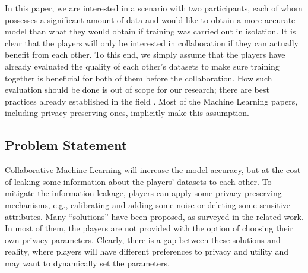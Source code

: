 \documentclass[USenglish,oneside,twocolumn]{article}
\theoremstyle{plain}
\newtheorem*{example}{Example}
\begin{document}
    In this paper, we are interested in a scenario with two participants, each of whom possesses a significant amount of data and would like to obtain a more accurate model than what they would obtain if training was carried out in isolation. It is clear that the players will only be interested in collaboration if they can actually benefit from each other. To this end, we simply assume that the players have already evaluated the quality of each other's datasets to make sure training together is beneficial for both of them before the collaboration. How such evaluation should be done is out of scope for our research; there are best practices already established in the field \cite{dmbook}. Most of the Machine Learning papers, including privacy-preserving ones, implicitly make this assumption. %
    
    
    \vspace{-0.5cm}
    \subsection{Problem Statement}
    \vspace{-0.25cm}
    
    
    Collaborative Machine Learning will increase the model accuracy, but at the cost of leaking some information about the players' datasets to each other. To mitigate the information leakage, players can apply some privacy-preserving mechanisms, e.g., calibrating and adding some noise or deleting some sensitive attributes. Many ``solutions'' have been proposed, as surveyed in the related work. In most of them, the players are not provided with the option of choosing their own privacy parameters. Clearly, there is a gap between these solutions and reality, where players will have different preferences to privacy and utility and may want to dynamically set the parameters.
    
\end{document}
